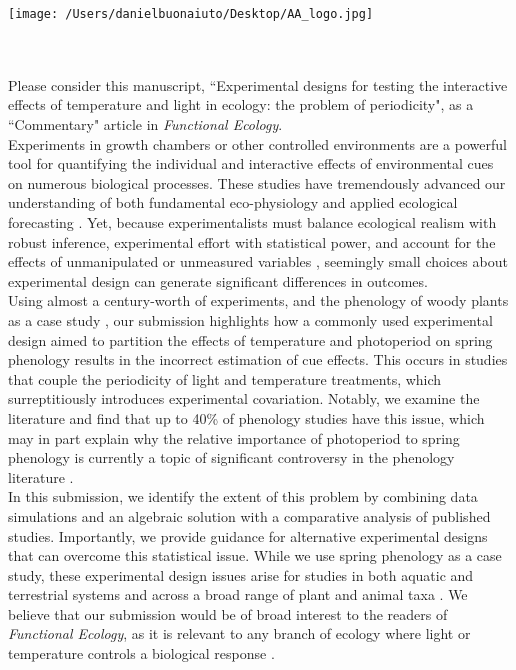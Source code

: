 \documentclass[11.5 pt]{article}
\begin{document}


\def\labelitemi{--}
\parindent=24pt
\noindent\texttt{[image: /Users/danielbuonaiuto/Desktop/AA\_logo.jpg]}
\\\\
\\ %
\vspace{1.5ex}

\noindent Please consider this manuscript, ``Experimental designs for testing the interactive effects of temperature and light in ecology: the problem of periodicity", as a ``Commentary" article in \textit{Functional Ecology}.\\

\noindent Experiments in growth chambers or other controlled environments are a powerful tool for quantifying the individual and interactive effects of environmental cues on numerous biological processes. These studies have tremendously advanced our understanding of both fundamental eco-physiology and applied ecological forecasting \citep{Osmond:2004wb}. Yet, because experimentalists must balance ecological realism with robust inference, experimental effort with statistical power, and account for the effects of unmanipulated or unmeasured variables \citep{schneiner2001}, seemingly small choices about experimental design can generate significant differences in outcomes.\\

\noindent Using almost a century-worth of experiments, and the phenology of woody plants as a case study \citep{wolkovich2019}, our submission highlights how a commonly used experimental design aimed to partition the effects of temperature and photoperiod on spring phenology results in the incorrect estimation of cue effects. This occurs in studies that couple the periodicity of light and temperature treatments, which surreptitiously introduces experimental covariation. Notably, we examine the literature and find that up to 40\% of phenology studies have this issue, which may in part explain why the relative importance of photoperiod to spring phenology is currently a topic of significant controversy in the phenology literature \citep{koerner2010a,CHUINE:2010wg,Jennifer:2010un,Zohner:2016uz,WAY:2015aa}. \\

\noindent In this submission, we identify the extent of this problem by combining data simulations and an algebraic solution with a comparative analysis of published studies. Importantly, we provide guidance for alternative experimental designs that can overcome this statistical issue. While we use spring phenology as a case study, these experimental design issues arise for studies in both aquatic and terrestrial systems and across a broad range of plant and animal taxa \citep{Stewart:2013wz}. We believe that our submission would be of broad interest to the readers of \textit{Functional Ecology}, as it is relevant to any branch of ecology where light or temperature controls a biological response \citep[e.g.,][]{Franklin:2009wo,Brown:2014vn,Casal:2018us}.\\
\end{document}
